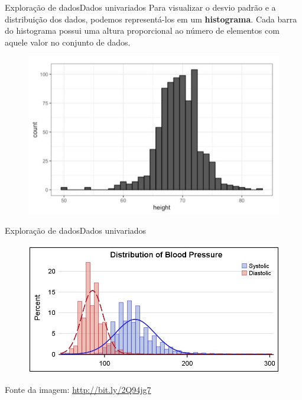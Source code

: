 \documentclass[t]{beamer}
\begin{document}
\begin{ftst}{Exploração de dados}{Dados univariados}
\footnotesize
\justifying
Para visualizar o desvio padrão e a distribuição dos dados, podemos representá-los em um \textbf{histograma}. Cada barra do histograma possui uma altura proporcional ao número de elementos com aquele valor no conjunto de dados.

\begin{figure}[h]
    \includegraphics[scale=0.6]{Figuras/histogram.jpg}
\end{figure}



\end{ftst}


\begin{ftst}{Exploração de dados}{Dados univariados}
\vone
\begin{figure}[h]
    \includegraphics[scale=0.4]{Figuras/slide01_07.jpg}
\end{figure}
\vone
\vone
\vone
\vone
\vone
\scriptsize
Fonte da imagem: \href{http://bit.ly/2Q94jg7}{http://bit.ly/2Q94jg7}
\end{ftst}
\end{document}
